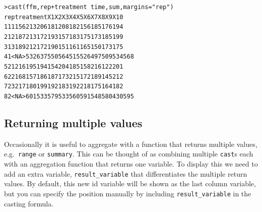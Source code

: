 \documentclass[oneside,letterpaper]{scrartcl}
\begin{document}
\begin{alltt}
> cast(ffm, rep + treatment ~ time, sum, margins = "rep")
  rep treatment  X1  X2  X3  X4  X5  X6  X7  X8  X9 X10
1   1         1 156 213 206 181 208 182 156 185 176 194
2   1         2 187 213 172 193 157 183 175 173 185 199
3   1         3 189 212 172 190 151 161 165 150 173 175
4   1      <NA> 532 637 550 564 515 526 497 509 534 568
5   2         1 216 195 194 154 204 185 158 216 122 201
6   2         2 168 157 186 187 173 215 172 189 145 212
7   2         3 217 180 199 192 183 192 218 175 164 182
8   2      <NA> 601 533 579 533 560 591 548 580 430 595

\end{alltt}

\subsection{Returning multiple values}\label{sub:multiple_returns}

Occasionally it is useful to aggregate with a function that returns multiple values, e.g.\ {\tt range} or {\tt summary}.  This can be thought of as combining multiple {\tt cast}s each with an aggregation function that returns one variable.  To display this we need to add an extra variable, {\tt result\_variable} that differentiates the multiple return values.   By default, this new id variable will be shown as the last column variable, but you can specify the position manually by including {\tt result\_variable} in the casting formula.
\end{document}
